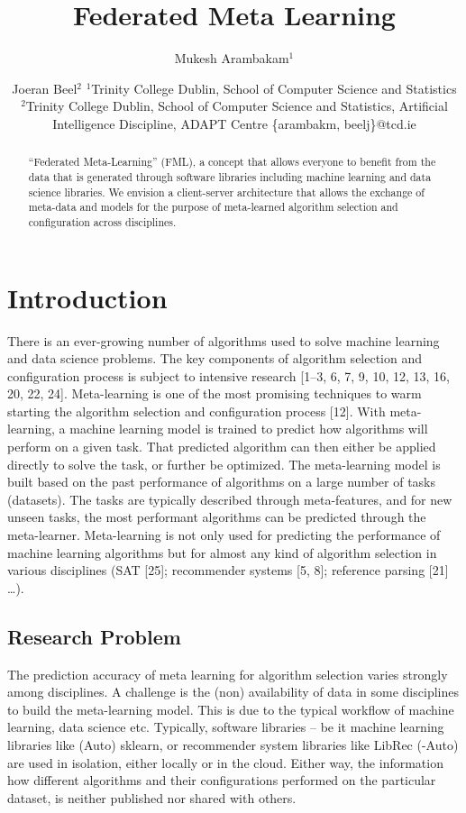 \documentclass{article}
\title{Federated Meta Learning}
\author{
Mukesh Arambakam$^1$
\and
Joeran Beel$^2$
\affiliations
$^1$Trinity College Dublin,
School of Computer Science and Statistics\\
$^2$Trinity College Dublin,
School of Computer Science and Statistics,
Artificial Intelligence Discipline,
ADAPT Centre
\emails
\{arambakm, beelj\}@tcd.ie
}
\begin{document}
\maketitle

\begin{abstract}
“Federated Meta-Learning” (FML), a concept that allows everyone to benefit from the data that is generated through software libraries including machine learning and data science libraries. We envision a client-server architecture that allows the exchange of meta-data and models for the purpose of meta-learned algorithm selection and configuration across disciplines.
\end{abstract}

\section{Introduction}
There is an ever-growing number of algorithms used to solve machine learning and data science problems. The key components of algorithm selection and configuration process is subject to intensive research [1–3, 6, 7, 9, 10, 12, 13, 16, 20, 22, 24]. 
Meta-learning is one of the most promising techniques to warm starting the algorithm selection and configuration process [12]. With meta-learning, a machine learning model is trained to predict how algorithms will perform on a given task. That predicted algorithm can then either be applied directly to solve the task, or further be optimized. The meta-learning model is built based on the past performance of algorithms on a large number of tasks (datasets). The tasks are typically described through meta-features, and for new unseen tasks, the most performant algorithms can be predicted through the meta-learner. Meta-learning is not only used for predicting the performance of machine learning algorithms but for almost any kind of algorithm selection in various disciplines (SAT [25]; recommender systems [5, 8]; reference parsing [21] …).

\subsection{Research Problem}
The prediction accuracy of meta learning for algorithm selection varies strongly among disciplines. A challenge is the (non) availability of data in some disciplines to build the meta-learning model. This is due to the typical workflow of machine learning, data science etc. Typically, software libraries – be it machine learning libraries like (Auto) sklearn, or recommender system libraries like LibRec (-Auto) are used in isolation, either locally or in the cloud. Either way, the information how different algorithms and their configurations performed on the particular dataset, is neither published nor shared with others.
\end{document}
